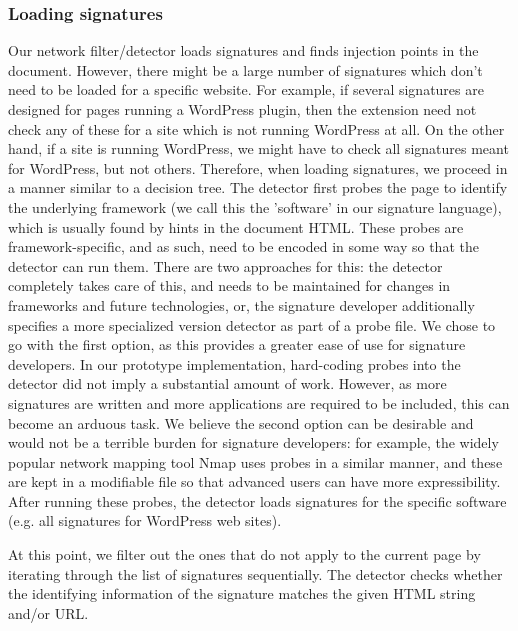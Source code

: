 \subsubsection{Loading signatures}
Our network filter/detector loads signatures and finds injection points in the document. However, there might be a large number of signatures which don't need to be loaded for a specific website. For example, if several signatures are designed for pages running a WordPress plugin, then the extension need not check any of these for a site which is not running WordPress at all. On the other hand, if a site is running WordPress, we might have to check all signatures meant for WordPress, but not others. Therefore, when loading signatures, we proceed in a manner similar to a decision tree. The detector first probes the page to identify the underlying framework (we call this the 'software' in our signature language), which is usually found by hints in the document HTML. These probes are framework-specific, and as such, need to be encoded in some way so that the detector can run them. There are two approaches for this: the detector completely takes care of this, and needs to be maintained for changes in frameworks and future technologies, or, the signature developer additionally specifies a more specialized version detector as part of a probe file. We chose to go with the first option, as this provides a greater ease of use for signature developers. In our prototype implementation, hard-coding probes into the detector did not imply a substantial amount of work. However, as more signatures are written and more applications are required to be included, this can become an arduous task. We believe the second option can be desirable and would not be a terrible burden for signature developers: for example, the widely popular network mapping tool Nmap \cite{nMap} uses probes in a similar manner, and these are kept in a modifiable file so that advanced users can have more expressibility. After running these probes, the detector loads signatures for the specific software (e.g. all signatures for WordPress web sites).  

At this point, we filter out the ones that do not apply to the current page by iterating through the list of signatures sequentially. The detector checks whether the identifying information of the signature matches the given HTML string and/or URL.

